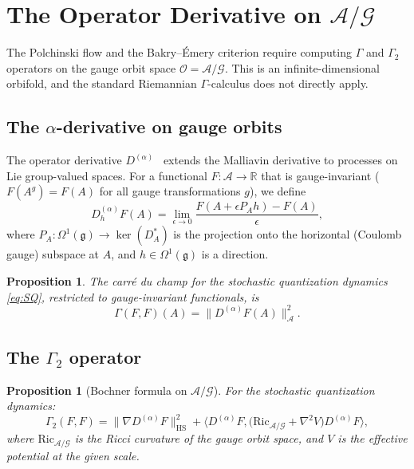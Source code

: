 \documentclass[11pt,a4paper]{article}
\theoremstyle{plain}
\newtheorem{proposition}[theorem]{Proposition}
\theoremstyle{definition}
\theoremstyle{remark}
\newcommand{\R}{\mathbb{R}}
\newcommand{\cA}{\mathcal{A}}
\newcommand{\cG}{\mathcal{G}}
\newcommand{\cO}{\mathcal{O}}
\newcommand{\g}{\mathfrak{g}}
\begin{document}
\section{The Operator Derivative on $\cA/\cG$}\label{sec:OD}

The Polchinski flow and the Bakry--\'Emery criterion require
computing $\Gamma$ and $\Gamma_2$ operators on the gauge orbit
space $\cO = \cA/\cG$. This is an infinite-dimensional
orbifold, and the standard Riemannian $\Gamma$-calculus does
not directly apply.

\subsection{The $\alpha$-derivative on gauge orbits}

The operator derivative $D^{(\alpha)}$~\cite{Fontes2025} extends
the Malliavin derivative to processes on Lie group-valued spaces.
For a functional $F: \cA \to \R$ that is gauge-invariant
($F(A^g) = F(A)$ for all gauge transformations $g$), we define
\begin{equation}\label{eq:OD}
  D^{(\alpha)}_h F(A) = \lim_{\epsilon \to 0}
  \frac{F(A + \epsilon P_A h) - F(A)}{\epsilon},
\end{equation}
where $P_A: \Omega^1(\g) \to \ker(D_A^*)$ is the projection onto
the horizontal (Coulomb gauge) subspace at $A$, and $h \in
\Omega^1(\g)$ is a direction.

\begin{proposition}\label{prop:OD-gamma}
The carr\'e du champ for the stochastic quantization dynamics
\eqref{eq:SQ}, restricted to gauge-invariant functionals, is
\begin{equation}
  \Gamma(F, F)(A) = \|D^{(\alpha)} F(A)\|^2_{\cA}.
\end{equation}
\end{proposition}

\subsection{The $\Gamma_2$ operator}

\begin{proposition}[Bochner formula on $\cA/\cG$]\label{prop:bochner}
For the stochastic quantization dynamics:
\begin{equation}\label{eq:bochner-gauge}
  \Gamma_2(F, F) = \|\nabla D^{(\alpha)} F\|^2_{\mathrm{HS}}
  + \langle D^{(\alpha)} F, \bigl(\mathrm{Ric}_{\cA/\cG}
  + \nabla^2 V\bigr) D^{(\alpha)} F \rangle,
\end{equation}
where $\mathrm{Ric}_{\cA/\cG}$ is the Ricci curvature of the
gauge orbit space, and $V$ is the effective potential at the
given scale.
\end{proposition}
\end{document}
